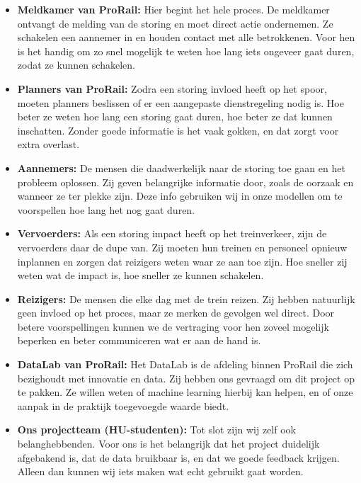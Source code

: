 \documentclass{article}
\begin{document}
\begin{itemize}
    \item \textbf{Meldkamer van ProRail:} Hier begint het hele proces. De meldkamer ontvangt de melding van de storing en moet direct actie ondernemen. Ze schakelen een aannemer in en houden contact met alle betrokkenen. Voor hen is het handig om zo snel mogelijk te weten hoe lang iets ongeveer gaat duren, zodat ze kunnen schakelen.

    \item \textbf{Planners van ProRail:} Zodra een storing invloed heeft op het spoor, moeten planners beslissen of er een aangepaste dienstregeling nodig is. Hoe beter ze weten hoe lang een storing gaat duren, hoe beter ze dat kunnen inschatten. Zonder goede informatie is het vaak gokken, en dat zorgt voor extra overlast.

    \item \textbf{Aannemers:} De mensen die daadwerkelijk naar de storing toe gaan en het probleem oplossen. Zij geven belangrijke informatie door, zoals de oorzaak en wanneer ze ter plekke zijn. Deze info gebruiken wij in onze modellen om te voorspellen hoe lang het nog gaat duren.

    \item \textbf{Vervoerders:} Als een storing impact heeft op het treinverkeer, zijn de vervoerders daar de dupe van. Zij moeten hun treinen en personeel opnieuw inplannen en zorgen dat reizigers weten waar ze aan toe zijn. Hoe sneller zij weten wat de impact is, hoe sneller ze kunnen schakelen.

    \item \textbf{Reizigers:} De mensen die elke dag met de trein reizen. Zij hebben natuurlijk geen invloed op het proces, maar ze merken de gevolgen wel direct. Door betere voorspellingen kunnen we de vertraging voor hen zoveel mogelijk beperken en beter communiceren wat er aan de hand is.

    \item \textbf{DataLab van ProRail:} Het DataLab is de afdeling binnen ProRail die zich bezighoudt met innovatie en data. Zij hebben ons gevraagd om dit project op te pakken. Ze willen weten of machine learning hierbij kan helpen, en of onze aanpak in de praktijk toegevoegde waarde biedt.

    \item \textbf{Ons projectteam (HU-studenten):} Tot slot zijn wij zelf ook belanghebbenden. Voor ons is het belangrijk dat het project duidelijk afgebakend is, dat de data bruikbaar is, en dat we goede feedback krijgen. Alleen dan kunnen wij iets maken wat echt gebruikt gaat worden.
\end{itemize}
\end{document}
